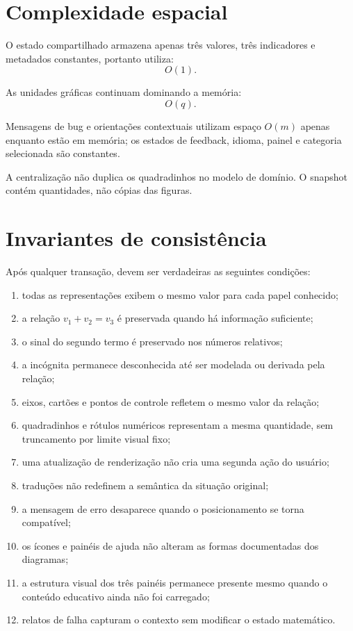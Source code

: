 \documentclass[12pt,a4paper]{article}
\begin{document}
\section{Complexidade espacial}

O estado compartilhado armazena apenas três valores, três indicadores e metadados constantes, portanto utiliza:
\[
O(1).
\]

As unidades gráficas continuam dominando a memória:
\[
O(q).
\]

Mensagens de bug e orientações contextuais utilizam espaço $O(m)$ apenas enquanto estão em memória; os estados de feedback, idioma, painel e categoria selecionada são constantes.

A centralização não duplica os quadradinhos no modelo de domínio. O snapshot contém quantidades, não cópias das figuras.

\section{Invariantes de consistência}

Após qualquer transação, devem ser verdadeiras as seguintes condições:
\begin{enumerate}[noitemsep]
  \item todas as representações exibem o mesmo valor para cada papel conhecido;
  \item a relação $v_1+v_2=v_3$ é preservada quando há informação suficiente;
  \item o sinal do segundo termo é preservado nos números relativos;
  \item a incógnita permanece desconhecida até ser modelada ou derivada pela relação;
  \item eixos, cartões e pontos de controle refletem o mesmo valor da relação;
  \item quadradinhos e rótulos numéricos representam a mesma quantidade, sem truncamento por limite visual fixo;
  \item uma atualização de renderização não cria uma segunda ação do usuário;
  \item traduções não redefinem a semântica da situação original;
  \item a mensagem de erro desaparece quando o posicionamento se torna compatível;
  \item os ícones e painéis de ajuda não alteram as formas documentadas dos diagramas;
  \item a estrutura visual dos três painéis permanece presente mesmo quando o conteúdo educativo ainda não foi carregado;
  \item relatos de falha capturam o contexto sem modificar o estado matemático.
\end{enumerate}
\end{document}
